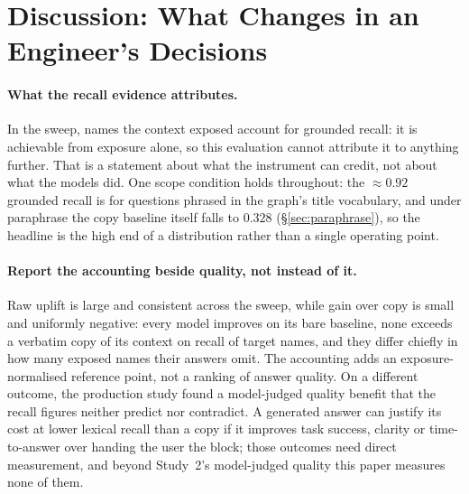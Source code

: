 \documentclass[10pt,twocolumn]{article}
\begin{document}
\section{Discussion: What Changes in an Engineer's Decisions}\label{sec:analysis}
\paragraph{What the recall evidence attributes.} In the sweep, names the context exposed account for grounded recall: it is achievable from exposure alone, so this evaluation cannot attribute it to anything further. That is a statement about what the instrument can credit, not about what the models did. One scope condition holds throughout: the $\approx0.92$ grounded recall is for questions phrased in the graph's title vocabulary, and under paraphrase the copy baseline itself falls to $0.328$ (\S\ref{sec:paraphrase}), so the headline is the high end of a distribution rather than a single operating point.

\paragraph{Report the accounting beside quality, not instead of it.} Raw uplift is large and consistent across the sweep, while gain over copy is small and uniformly negative: every model improves on its bare baseline, none exceeds a verbatim copy of its context on recall of target names, and they differ chiefly in how many exposed names their answers omit. The accounting adds an exposure-normalised reference point, not a ranking of answer quality. On a different outcome, the production study found a model-judged quality benefit that the recall figures neither predict nor contradict. A generated answer can justify its cost at lower lexical recall than a copy if it improves task success, clarity or time-to-answer over handing the user the block; those outcomes need direct measurement, and beyond Study~2's model-judged quality this paper measures none of them.
\end{document}
